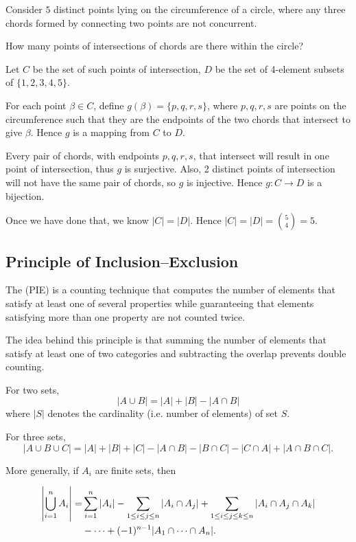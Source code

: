 \begin{exercise}
Consider $5$ distinct points lying on the circumference of a circle, where any three chords formed by connecting two points are not concurrent.

How many points of intersections of chords are there within the circle?
\end{exercise}

\begin{solution}
Let $C$ be the set of such points of intersection, $D$ be the set of 4-element subsets of $\{1,2,3,4,5\}$.

For each point $\beta\in C$, define $g(\beta)=\{p,q,r,s\}$, where $p,q,r,s$ are points on the circumference such that they are the endpoints of the two chords that intersect to give $\beta$. Hence $g$ is a mapping from $C$ to $D$.

Every pair of chords, with endpoints $p,q,r,s$, that intersect will result in one point of intersection, thus $g$ is surjective. Also, 2 distinct points of intersection will not have the same pair of chords, so $g$ is injective. Hence $g:C\to D$ is a bijection.

Once we have done that, we know $|C|=|D|$. Hence $|C|=|D|=\binom{5}{4}=5$.
\end{solution}

\subsection{Principle of Inclusion--Exclusion}
The  (PIE) is a counting technique that computes the number of elements that satisfy at least one of several properties while guaranteeing that elements satisfying more than one property are not counted twice.

The idea behind this principle is that summing the number of elements that satisfy at least one of two categories and subtracting the overlap prevents double counting.

For two sets, 
\[ |A \cup B| = |A| + |B| - |A \cap B| \] 
where $|S|$ denotes the cardinality (i.e. number of elements) of set $S$.

For three sets,  \[ |A\cup B\cup C|=|A|+|B|+|C|-|A\cap B|-|B\cap C|-|C\cap A|+|A\cap B\cap C|. \]

More generally, if $A_i$ are finite sets, then
\begin{theorem}
\begin{equation} 
\begin{aligned} \left|\bigcup_{i=1}^{n} A_i\right|=&\sum_{i=1}^{n}|A_i|-\sum_{1 \le i \le j \le n}|A_i \cap A_j|+\sum_{1 \le i \le j \le k \le n}|A_i\cap A_j\cap A_k|\\
&-\cdots+(-1)^{n-1}|A_1\cap\cdots\cap A_n|. 
\end{aligned} 
\end{equation}
\end{theorem}

